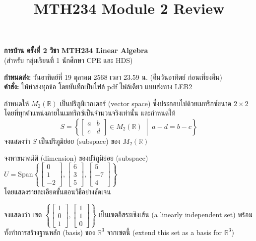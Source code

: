 ﻿\documentclass[12pt, a4paper]{exam}
\title{MTH234 Module 2 Review}
\date{}
\begin{document}
\begin{center}
    \textbf{\Large การบ้าน ครั้งที่ 2 วิชา MTH234 Linear Algebra} \\
    (สำหรับ กลุ่มเรียนที่ 1 นักศึกษา CPE และ HDS)
\end{center}
\vspace{0.2cm}
\noindent \textbf{กำหนดส่ง:} วันอาทิตย์ที่ 19 ตุลาคม 2568 เวลา 23.59 น. (คืนวันอาทิตย์ ก่อนเที่ยงคืน) \\
\noindent \textbf{คำสั่ง:} ให้ทำส่งทุกข้อ โดยบันทึกเป็นไฟล์ pdf ไฟล์เดียว แบบส่งทาง LEB2
\vspace{0.5cm}

\begin{questions}

\question กำหนดให้ $M_2(\mathbb{R})$ เป็นปริภูมิเวกเตอร์ (vector space) ซึ่งประกอบไปด้วยเมทริกซ์ขนาด $2 \times 2$ โดยที่ทุกตำแหน่งภายในเมทริกซ์เป็นจำนวนจริงเท่านั้น และกำหนดให้
\[
S = \left\{ \begin{bmatrix} a & b \\ c & d \end{bmatrix} \in M_2(\mathbb{R}) \;\middle|\; a - d = b - c \right\}
\]
จงแสดงว่า $S$ เป็นปริภูมิย่อย (subspace) ของ $M_2(\mathbb{R})$

\question จงหาขนาดมิติ (dimension) ของปริภูมิย่อย (subspace) $U = \text{Span} \left\{ \begin{bmatrix} 0 \\ 1 \\ -2 \end{bmatrix}, \begin{bmatrix} 6 \\ 3 \\ 5 \end{bmatrix}, \begin{bmatrix} 5 \\ -7 \\ 4 \end{bmatrix} \right\}$ \\
โดยแสดงรายละเอียดขั้นตอนวิธีอย่างชัดเจน

\question จงแสดงว่า เซต $\left\{ \begin{bmatrix} 1 \\ 0 \\ 1 \end{bmatrix}, \begin{bmatrix} 1 \\ 1 \\ 0 \end{bmatrix} \right\}$ เป็นเซตอิสระเชิงเส้น (a linearly independent set) พร้อมทั้งทำการสร้างฐานหลัก (basis) ของ $\mathbb{R}^3$ จากเซตนี้ (extend this set as a basis for $\mathbb{R}^3$)
\newpage


\end{questions}
\end{document}
